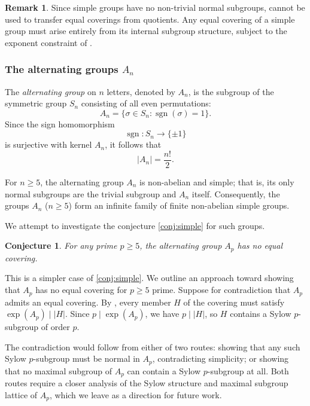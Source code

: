 \documentclass[12pt, a4paper]{article}
\theoremstyle{plain}
\newtheorem{conjecture}[theorem]{Conjecture}
\theoremstyle{definition}
\newtheorem{remark}[theorem]{Remark}
\begin{document}
\begin{remark}
  Since simple groups have no non-trivial normal subgroups, 
  cannot be used to transfer equal coverings from quotients. Any equal covering
  of a simple group must arise entirely from its internal subgroup structure,
  subject to the exponent constraint of .
\end{remark}

\subsubsection{The alternating groups $A_n$}
The \emph{alternating group} on \(n\) letters, denoted by \(A_n\), is the subgroup of the symmetric group \(S_n\) consisting of all even permutations:
\[
A_n=\{\sigma\in S_n:\operatorname{sgn}(\sigma)=1\}.
\]
Since the sign homomorphism
\[
\operatorname{sgn}:S_n\to\{\pm1\}
\]
is surjective with kernel \(A_n\), it follows that
\[
|A_n|=\frac{n!}{2}.
\]

For \(n\ge5\), the alternating group \(A_n\) is non-abelian and simple; that is, its only normal subgroups are the trivial subgroup and \(A_n\) itself. Consequently, the groups \(A_n\) (\(n\ge5\)) form an infinite family of finite non-abelian simple groups.


We attempt to investigate the conjecture \ref{conj:simple} for such groups.



\begin{conjecture}
  \label{prop:Ap}
  For any prime $p \geq 5$, the alternating group $A_p$ has no equal covering.
\end{conjecture}
This is a simpler case of \ref{conj:simple}.
We outline an approach toward showing that $A_p$ has no equal covering
for $p \geq 5$ prime. Suppose for contradiction that $A_p$ admits an
equal covering. By , every member $H$ of the covering must
satisfy $\exp(A_p) \mid |H|$. Since $p \mid \exp(A_p)$, we have $p \mid
|H|$, so $H$ contains a Sylow $p$-subgroup of order $p$.
 
The contradiction would follow from either of two routes: showing that
any such Sylow $p$-subgroup must be normal in $A_p$, contradicting
simplicity; or showing that no maximal subgroup of $A_p$ can contain a
Sylow $p$-subgroup at all. Both routes require a closer analysis of the
Sylow structure and maximal subgroup lattice of $A_p$, which we leave as
a direction for future work.
 
\end{document}
